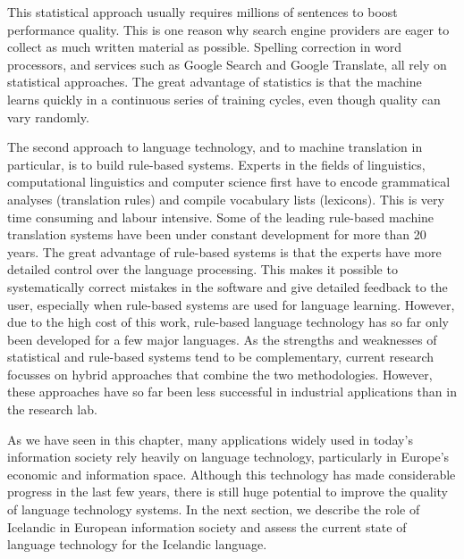 \begin{multicols}{2}
This statistical approach usually requires millions of sentences to boost performance quality. This is one reason why search engine providers are eager to collect as much written material as possible. Spelling correction in word processors, and services such as Google Search and Google Translate, all rely on statistical approaches. The great advantage of statistics is that the machine learns quickly in a continuous series of training cycles, even though quality can vary randomly.

The second approach to language technology, and to machine translation in particular, is to build rule-based systems. Experts in the fields of linguistics, computational linguistics and computer science first have to encode grammatical analyses (translation rules) and compile vocabulary lists (lexicons). This is very time consuming and labour intensive. Some of the leading rule-based machine translation systems have been under constant development for more than 20 years. The great advantage of rule-based systems is that the experts have more detailed control over the language processing. This makes it possible to systematically correct mistakes in the software and give detailed feedback to the user, especially when rule-based systems are used for language learning. However, due to the high cost of this work, rule-based language technology has so far only been developed for a few major languages. 
As the strengths and weaknesses of statistical and rule-based systems tend to be complementary, current research focusses on hybrid approaches that combine the two methodologies. However, these approaches have so far been less successful in industrial applications than in the research lab. 

As we have seen in this chapter, many applications widely used in today’s information society rely heavily on language technology, particularly in Europe’s economic and information space. Although this technology has made considerable progress in the last few years, there is still huge potential to improve the quality of language technology systems. In the next section, we describe the role of Icelandic in European information society and assess the current state of language technology for the Icelandic language.
\end{multicols}

\clearpage


